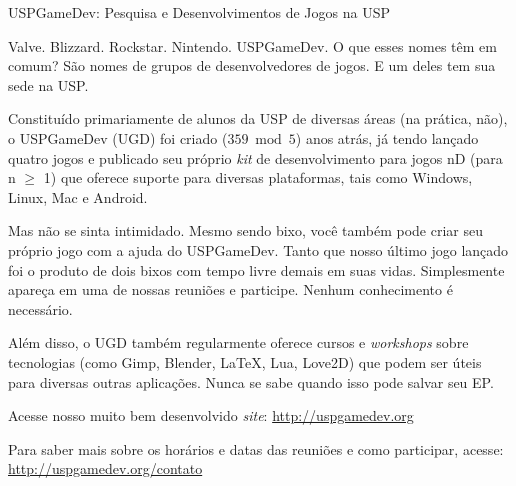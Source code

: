 \begin{secao}{USPGameDev: Pesquisa e Desenvolvimentos de Jogos na USP}

Valve. Blizzard. Rockstar. Nintendo. USPGameDev. O que esses nomes têm em comum?
São nomes de grupos de desenvolvedores de jogos. E um deles tem sua sede na USP.

Constituído primariamente de alunos da USP de diversas áreas (na prática, não), o 
USPGameDev (UGD) foi criado ($359 \bmod 5$) anos atrás, já tendo lançado quatro jogos e 
publicado seu próprio \textit{kit} de desenvolvimento para jogos nD (para n $\geq$ 1) que 
oferece suporte para diversas plataformas, tais como Windows, Linux, Mac e Android. 

Mas não se sinta intimidado. Mesmo sendo bixo, você também pode criar seu
próprio jogo com a ajuda do USPGameDev. Tanto que nosso último jogo lançado
foi o produto de dois bixos com tempo livre demais em suas vidas. Simplesmente
apareça em uma de nossas reuniões e participe. Nenhum conhecimento é necessário.

Além disso, o UGD também regularmente oferece cursos e \textit{workshops} sobre tecnologias
(como Gimp, Blender, LaTeX, Lua, Love2D) que podem ser úteis para
diversas outras aplicações. Nunca se sabe quando isso pode
salvar seu EP.

Acesse nosso muito bem desenvolvido \textit{site}: \url{http://uspgamedev.org}

Para saber mais sobre os horários e datas das reuniões e como participar, acesse: \url{http://uspgamedev.org/contato}

\end{secao}

